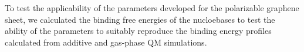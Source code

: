 To test the applicability of the parameters developed for the polarizable graphene sheet, we calculated the binding free energies of the nucloebases to test the ability of the parameters to suitably reproduce the binding energy profiles calculated from additive and gas-phase QM simulations.


